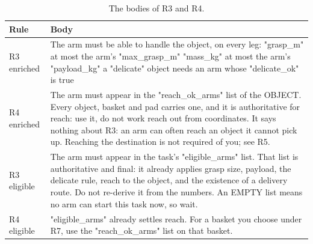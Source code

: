 \begin{table}[H]
\centering
\caption{The bodies of R3 and R4.}
\label{tab:appendix:rules}
\begin{tabular}{lp{}}
\toprule
Rule & Body \\
\midrule
R3 enriched & The arm must be able to handle the object, on every leg: "grasp\_m" at most the arm's "max\_grasp\_m" "mass\_kg" at most the arm's "payload\_kg" a "delicate" object needs an arm whose "delicate\_ok" is true \\
R4 enriched & The arm must appear in the "reach\_ok\_arms" list of the OBJECT. Every object, basket and pad carries one, and it is authoritative for reach: use it, do not work reach out from coordinates. It says nothing about R3: an arm can often reach an object it cannot pick up. Reaching the destination is not required of you; see R5. \\
R3 eligible & The arm must appear in the task's "eligible\_arms" list. That list is authoritative and final: it already applies grasp size, payload, the delicate rule, reach to the object, and the existence of a delivery route. Do not re-derive it from the numbers. An EMPTY list means no arm can start this task now, so wait. \\
R4 eligible & "eligible\_arms" already settles reach. For a basket you choose under R7, use the "reach\_ok\_arms" list on that basket. \\
\bottomrule
\end{tabular}
\end{table}
